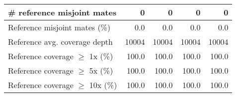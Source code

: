 \documentclass[12pt,a4paper]{article}
\begin{document}
\begin{table}[ht]
\begin{center}
\begin{tabular}{|l*{4}{|r}|}
\# reference misjoint mates & 0 & 0 & 0 & 0 \\ \hline
Reference misjoint mates (\%) & 0.0 & 0.0 & 0.0 & 0.0 \\ \hline
Reference avg. coverage depth & 10004 & 10004 & 10004 & 10004 \\ \hline
Reference coverage $\geq$ 1x (\%) & 100.0 & 100.0 & 100.0 & 100.0 \\ \hline
Reference coverage $\geq$ 5x (\%) & 100.0 & 100.0 & 100.0 & 100.0 \\ \hline
Reference coverage $\geq$ 10x (\%) & 100.0 & 100.0 & 100.0 & 100.0 \\ \hline
\end{tabular}
\end{center}
\end{table}
\end{document}
